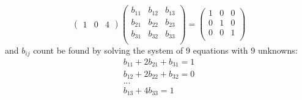 \documentclass[11pt]{article}
\theoremstyle{definition}
\theoremstyle{remark}
\begin{document}
\begin{itemize}
$$\begin{pmatrix}
1&0&4 
\end{pmatrix}
\begin{pmatrix}
b_{11}&b_{12}&b_{13} \\
b_{21}&b_{22}&b_{23} \\
b_{31}&b_{32}&b_{33} \\
\end{pmatrix}
=
\begin{pmatrix}
1&0&0 \\
0&1&0 \\
0&0&1 \\
\end{pmatrix}
$$
and $b_{ij}$ count be found by solving the system of 9 equations with 9 unknowns:
\begin{equation}
\begin{split}
b_{11} + 2b_{21} + b_{31} = 1 
\\
b_{12} + 2b_{22} + b_{32} = 0
\\
... 
\\
b_{13} + 4b_{33} = 1
\end{split}
\end{equation}



\end{itemize}
\end{document}
